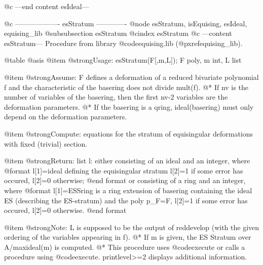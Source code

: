 @c ---end content esIdeal---

@c ------------------- esStratum -------------
@node esStratum, isEquising, esIdeal, equising_lib
@subsubsection esStratum
@cindex esStratum
@c ---content esStratum---
Procedure from library @code{equising.lib} (@pxref{equising_lib}).

@table @asis
@item @strong{Usage:}
esStratum(F[,m,L]); F poly, m int, L list

@item @strong{Assume:}
F defines a deformation of a reduced bivariate polynomial f
and the characteristic of the basering does not divide mult(f). @*
If nv is the number of variables of the basering, then the first
nv-2 variables are the deformation parameters. @*
If the basering is a qring, ideal(basering) must only depend
on the deformation parameters.

@item @strong{Compute:}
equations for the stratum of equisingular deformations with 
fixed (trivial) section.

@item @strong{Return:}
list l: either consisting of an ideal and an integer, where
@format
  l[1]=ideal defining the equisingular stratum
  l[2]=1 if some error has occured,  l[2]=0 otherwise;
@end format
or consisting of a ring and an integer, where
@format
  l[1]=ESSring is a ring extension of basering containing the ideal ES 
        (describing the ES-stratum) and the poly p_F=F,
  l[2]=1 if some error has occured,  l[2]=0 otherwise.
@end format

@item @strong{Note:}
L is supposed to be the output of reddevelop (with the given ordering
of the variables appearing in f). @*
If m is given, the ES Stratum over A/maxideal(m) is computed. @*
This procedure uses @code{execute} or calls a procedure using
@code{execute}.
printlevel>=2 displays additional information.


